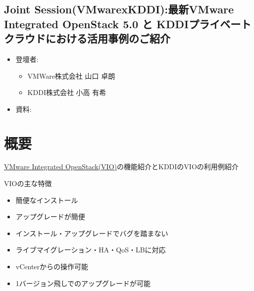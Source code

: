 \begin{center}
  \section*{Joint Session(VMwarexKDDI):最新VMware Integrated OpenStack 5.0 と KDDIプライベートクラウドにおける活用事例のご紹介}
\end{center}


\begin{flushright}
  \begin{itemize}
  \item   登壇者:
    \begin{itemize}
    \item VMWare株式会社 山口 卓朗
    \item KDDI株式会社 小高 有希
    \end{itemize}
  \item 資料: 
  \end{itemize}
\end{flushright}

\section*{概要}

\href{https://www.vmware.com/jp/products/openstack.html}{VMware Integrated OpenStack(VIO)}の機能紹介とKDDIのVIOの利用例紹介

VIOの主な特徴

\begin{itemize}
\item 簡便なインストール
\item アップグレードが簡便
\item インストール・アップグレードでバグを踏まない
\item ライブマイグレーション・HA・QoS・LBに対応
\item vCenterからの操作可能
\item 1バージョン飛しでのアップグレードが可能
\end{itemize}
